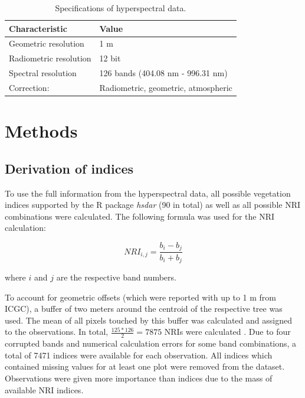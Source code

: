 \documentclass[review]{elsarticle}
\begin{document}
\begin{table}[b!]
\centering
\caption[t]{Specifications of hyperspectral data.}
\begingroup\footnotesize
\begin{tabular}{ll}
	\\
	Characteristic         & Value                               \\
	\hline
	Geometric resolution   & 1 m                                 \\
	Radiometric resolution & 12 bit                              \\
	Spectral resolution    & 126 bands (404.08 nm - 996.31 nm)   \\
	Correction:            & Radiometric, geometric, atmospheric
\end{tabular}
\endgroup
\label{tab:hyperparameter_limits}
\end{table}

\section{Methods}

\subsection{Derivation of indices}
\noindent To use the full information from the hyperspectral data, all possible vegetation indices supported by the R package \textit{hsdar} (90 in total) as well as all possible \ac{NRI} combinations were calculated.
The following formula was used for the NRI calculation:

\begin{equation}
	NRI_{i,j} = \frac{b_{i} - b_{j}}{b_{i} + b_{j}}
\end{equation}

\noindent
where $i$ and $j$ are the respective band numbers.

\bigbreak

\noindent To account for geometric offsets (which were reported with up to 1 m from \ac{ICGC}), a buffer of two meters around the centroid of the respective tree was used.
The mean of all pixels touched by this buffer was calculated and assigned to the observations.
In total, $\frac{125*126}{2} = 7875$ NRIs were calculated .
Due to four corrupted bands and numerical calculation errors for some band combinations, a total of 7471 indices were available for each observation.
All indices which contained missing values for at least one plot were removed from the dataset.
Observations were given more importance than indices due to the mass of available \ac{NRI} indices.
\end{document}
